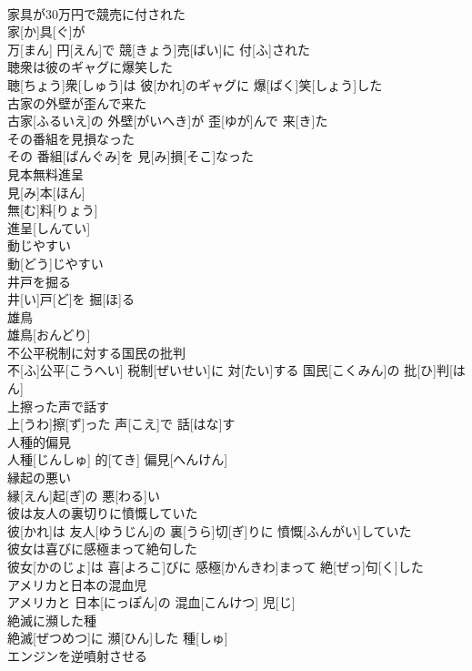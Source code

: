 \documentclass[8pt]{extreport}
\begin{document}
\begin{CJK}{UTF8}{min}
\\	家具が30万円で競売に付された	
\\	家[か]具[ぐ]が 
\\	万[まん] 円[えん]で 競[きょう]売[ばい]に 付[ふ]された
\\	聴衆は彼のギャグに爆笑した	
\\	聴[ちょう]衆[しゅう]は 彼[かれ]のギャグに 爆[ばく]笑[しょう]した
\\	古家の外壁が歪んで来た	
\\	古家[ふるいえ]の 外壁[がいへき]が 歪[ゆが]んで 来[き]た
\\	その番組を見損なった	
\\	その 番組[ばんぐみ]を 見[み]損[そこ]なった
\\	見本無料進呈	
\\	見[み]本[ほん]
\\	無[む]料[りょう]
\\	進呈[しんてい]
\\	動じやすい	
\\	動[どう]じやすい
\\	井戸を掘る	
\\	井[い]戸[ど]を 掘[ほ]る
\\	雄鳥	
\\	雄鳥[おんどり]
\\	不公平税制に対する国民の批判	
\\	不[ふ]公平[こうへい] 税制[ぜいせい]に 対[たい]する 国民[こくみん]の 批[ひ]判[はん]
\\	上擦った声で話す	
\\	上[うわ]擦[ず]った 声[こえ]で 話[はな]す
\\	人種的偏見	
\\	人種[じんしゅ] 的[てき] 偏見[へんけん]
\\	縁起の悪い	
\\	縁[えん]起[ぎ]の 悪[わる]い
\\	彼は友人の裏切りに憤慨していた	
\\	彼[かれ]は 友人[ゆうじん]の 裏[うら]切[ぎ]りに 憤慨[ふんがい]していた
\\	彼女は喜びに感極まって絶句した	
\\	彼女[かのじょ]は 喜[よろこ]びに 感極[かんきわ]まって 絶[ぜっ]句[く]した
\\	アメリカと日本の混血児	
\\	アメリカと 日本[にっぽん]の 混血[こんけつ] 児[じ]
\\	絶滅に瀕した種	
\\	絶滅[ぜつめつ]に 瀕[ひん]した 種[しゅ]
\\	エンジンを逆噴射させる	

\end{CJK}
\end{document}
